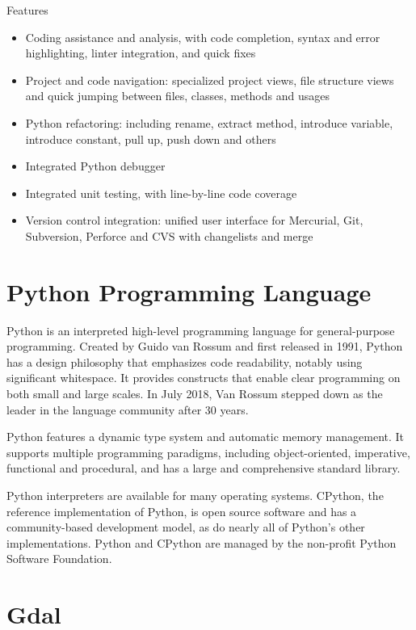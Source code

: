\documentclass[12pt, a4paper]{report}
\begin{document}
{\Large Features\par}

\begin{itemize}
  \item Coding assistance and analysis, with code completion, syntax and error highlighting, linter integration, and quick fixes
  \item Project and code navigation: specialized project views, file structure views and quick jumping between files, classes, methods and usages
  \item Python refactoring: including rename, extract method, introduce variable, introduce constant, pull up, push down and others
  \item Integrated Python debugger
  \item Integrated unit testing, with line-by-line code coverage
  \item Version control integration: unified user interface for Mercurial, Git, Subversion, Perforce and CVS with changelists and merge
\end{itemize}

\newpage{}

\section{Python Programming Language}

Python is an interpreted high-level programming language for general-purpose programming. Created by Guido van Rossum and first released in 1991, Python has a design philosophy that emphasizes code readability, notably using significant whitespace. It provides constructs that enable clear programming on both small and large scales. In July 2018, Van Rossum stepped down as the leader in the language community after 30 years.


Python features a dynamic type system and automatic memory management. It supports multiple programming paradigms, including object-oriented, imperative, functional and procedural, and has a large and comprehensive standard library.


Python interpreters are available for many operating systems. CPython, the reference implementation of Python, is open source software and has a community-based development model, as do nearly all of Python's other implementations. Python and CPython are managed by the non-profit Python Software Foundation. 


\newpage{}

\section{Gdal} 
\end{document}
